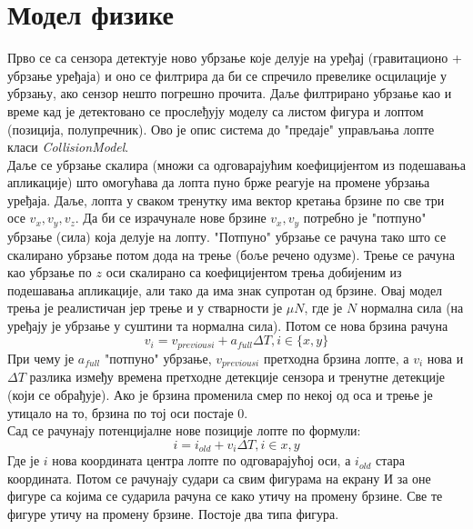 \chapter{Модел физике} \label{Collision}


Прво се са сензора детектује ново убрзање које делује на уређај (гравитационо + убрзање уређаја) и оно се филтрира да би се спречило превелике осцилације у убрзању, ако сензор нешто погрешно прочита. Даље филтрирано убрзање као и време кад је детектовано се прослеђују моделу са листом фигура и лоптом (позиција, полупречник). Ово је опис система до "предаје" управљања лопте класи \emph{CollisionModel}.
\\ \indent
Даље се убрзање скалира (множи са одговарајућим коефицијентом из подешавања апликације) што омогућава да лопта пуно брже реагује на промене убрзања уређаја.
Даље, лопта у сваком тренутку има вектор кретања брзине по све три осе $v_x, v_y, v_z$. Да би се израчунале нове брзине $v_x, v_y$ потребно је "потпуно" убрзање (сила) која делује на лопту. "Потпуно" убрзање се рачуна тако што се скалирано убрзање потом дода на трење (боље речено одузме). Трење се рачуна као убрзање по $z$ оси скалирано са коефицијентом трења добијеним из подешавања апликације, али тако да има знак супротан од брзине. Овај модел трења је реалистичан јер трење и у стварности је $\mu N$, где је $N$ нормална сила (на уређају је убрзање у суштини та нормална сила). Потом се нова брзина рачуна
$$v_i=v_{previousi} + a_{full}  \Delta T, i \in \{x, y\}$$
При чему је $a_{full}$ "потпуно" убрзање, $v_{previousi}$ претходна брзина лопте, а $v_i$ нова и $\Delta T$  разлика између времена претходне детекције сензора и тренутне детекције (који се обрађује). Ако је брзина променила смер по некој од оса и трење је утицало на то, брзина по тој оси постаје 0.
\\ \indent
Сад се рачунају потенцијалне нове позиције лопте по формули:
$$i = i_{old} + v_i \Delta T, i\in{x, y}$$
Где је $i$ нова координата центра лопте по одговарајућој оси, а $i_{old}$ стара координата. Потом се рачунају судари са свим фигурама на екрану И за оне фигуре са којима се сударила рачуна се како утичу на промену брзине. Све те фигуре утичу на промену брзине.  Постоје два типа фигура.
\\ \indent
